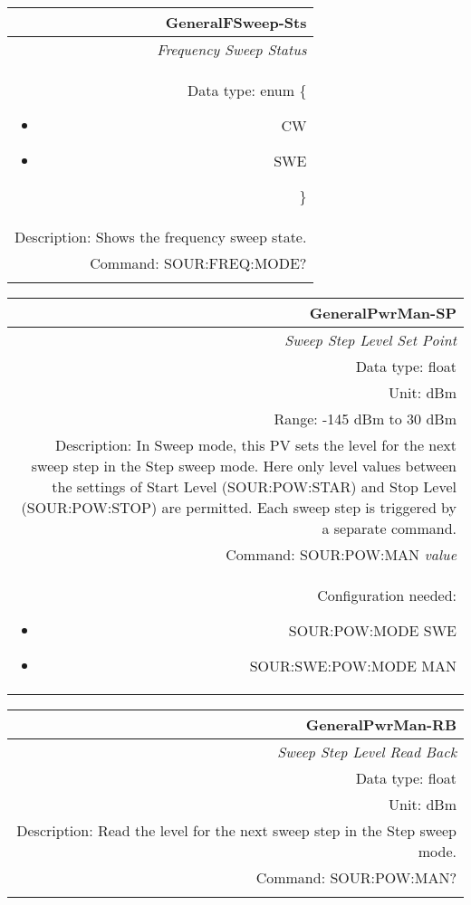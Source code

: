 \documentclass[openany]{article}
\begin{document}
		\begin{tabular}{N}
			\hline
			\bfseries GeneralFSweep-Sts \\ \hline
			\emph{Frequency Sweep Status} \\
			Data type: enum \{\begin{itemize}[noitemsep]
				\small
				\item[] CW
				\item[] SWE
			\end{itemize}\} \\
			Description: Shows the frequency sweep state. \\
			Command: SOUR:FREQ:MODE? \\
			\\

		\end{tabular}


		\begin{tabular}{N}
			\hline
			\bfseries GeneralPwrMan-SP \\ \hline
			\emph{Sweep Step Level Set Point} \\
			Data type: float \\
			Unit: dBm \\
			Range: -145 dBm to 30 dBm \\
			Description: In Sweep mode, this PV sets the level for the next sweep step in the Step sweep mode. Here only level values between the settings of  Start Level (SOUR:POW:STAR) and Stop Level (SOUR:POW:STOP) are permitted. Each sweep step is triggered by a separate command. \\
			Command: SOUR:POW:MAN \emph{value} \\
			Configuration needed:
				\begin{itemize}[noitemsep]
				\small
				\item[] SOUR:POW:MODE SWE
				\item[] SOUR:SWE:POW:MODE MAN
				\end{itemize} \\

		\end{tabular}


		\begin{tabular}{N}
			\hline
			\bfseries GeneralPwrMan-RB \\ \hline
			\emph{Sweep Step Level Read Back} \\
			Data type: float \\
			Unit: dBm \\
			Description: Read the level for the next sweep step in the Step sweep mode. \\
			Command: SOUR:POW:MAN? \\
			\\

		\end{tabular}
\end{document}
